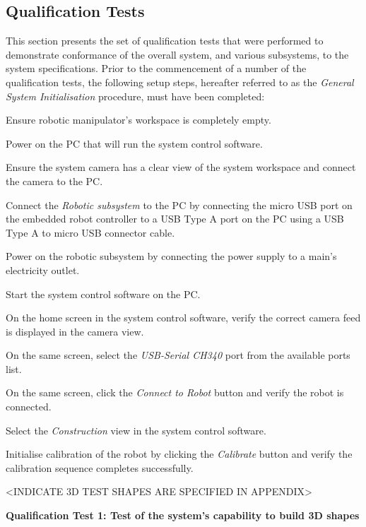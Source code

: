 \subsection{Qualification Tests}

This section presents the set of qualification tests that were performed to demonstrate conformance of the overall system, and various subsystems, to the system specifications. Prior to the commencement of a number of the qualification tests, the following setup steps, hereafter referred to as the \textit{General System Initialisation} procedure, must have been completed:

\begin{compactenum}
	\item Ensure robotic manipulator's workspace is completely empty.
	\item Power on the PC that will run the system control software.
	\item Ensure the system camera has a clear view of the system workspace and connect the camera to the PC.
	\item Connect the \textit{Robotic subsystem} to the PC by connecting the micro USB port on the embedded robot controller to a USB Type A port on the PC using a USB Type A to micro USB connector cable.
	\item Power on the robotic subsystem by connecting the power supply to a main's electricity outlet.
	\item Start the system control software on the PC.
	\item On the home screen in the system control software, verify the correct camera feed is displayed in the camera view.
	\item On the same screen, select the \textit{USB-Serial CH340} port from the available ports list.
	\item On the same screen, click the \textit{Connect to Robot} button and verify the robot is connected.
	\item Select the \textit{Construction} view in the system control software.
	\item Initialise calibration of the robot by clicking the \textit{Calibrate} button and verify the calibration sequence completes successfully.
\end{compactenum}

<INDICATE 3D TEST SHAPES ARE SPECIFIED IN APPENDIX>

\textbf{Qualification Test 1: Test of the system's capability to build 3D shapes}

